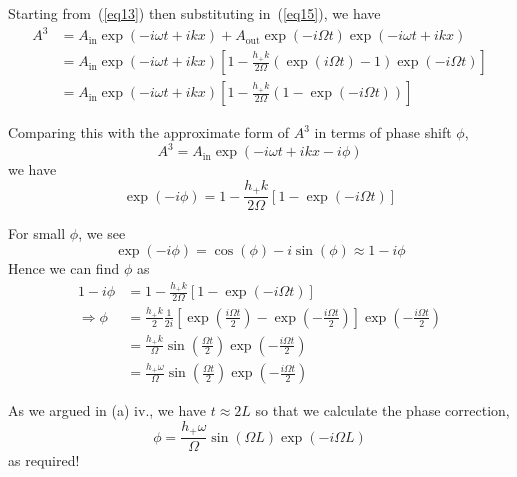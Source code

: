 \documentclass[a4paper]{article} %
\newcommand{\ao}{A_{\text{out}}}
\newcommand{\ai}{A_{\text{in}}}
\begin{document}
Starting from~(\ref{eq13}) then substituting in~(\ref{eq15}), we have
\begin{align}
A^3 &=\ai\exp(-i\omega t + ikx)+\ao\exp(-i\Omega t)\exp(-i\omega t + ikx)\\
&=\ai\exp(-i\omega t + ikx)\left[1-\frac{h_+k}{2\Omega}\left(\exp(i\Omega t)-1\right)\exp(-i\Omega t)\right]\\
&=\ai\exp(-i\omega t + ikx)\left[1-\frac{h_+k}{2\Omega}\left(1-\exp(-i\Omega t)\right)\right]
\end{align}

Comparing this with the approximate form of $A^3$ in terms of phase shift $\phi$,
\begin{equation}
A^3 = \ai\exp(-i\omega t + ikx -i\phi)
\end{equation}
we have
\begin{equation}
\exp(-i\phi)=1-\frac{h_+k}{2\Omega}\left[1-\exp(-i\Omega t)\right]
\end{equation}

For small $\phi$, we see
\begin{equation}
\exp(-i\phi)=\cos(\phi)-i\sin(\phi)\approx 1-i\phi
\end{equation}
Hence we can find $\phi$ as
\begin{align}
1-i\phi &= 1-\frac{h_+k}{2\Omega}\left[1-\exp(-i\Omega t)\right]\\
\Rightarrow \phi &= \frac{h_+k}{2}\frac{1}{2i}\left[\exp\left(\frac{i\Omega t}{2}\right)
-\exp\left(-\frac{i\Omega t}{2}\right)\right]\exp\left(-\frac{i\Omega t}{2}\right)\\
&=\frac{h_+k}{\Omega}\sin\left(\frac{\Omega t}{2}\right)\exp\left(-\frac{i\Omega t}{2}\right)\\
&=\frac{h_+\omega}{\Omega}\sin\left(\frac{\Omega t}{2}\right)\exp\left(-\frac{i\Omega t}{2}\right)
\end{align}

As we argued in (a) iv., we have $t\approx 2L$ so that we calculate the phase correction,
\begin{equation}
\phi = \frac{h_+ \omega}{\Omega}\sin(\Omega L) \exp(-i \Omega L)
\end{equation}
as required!
\end{document}
